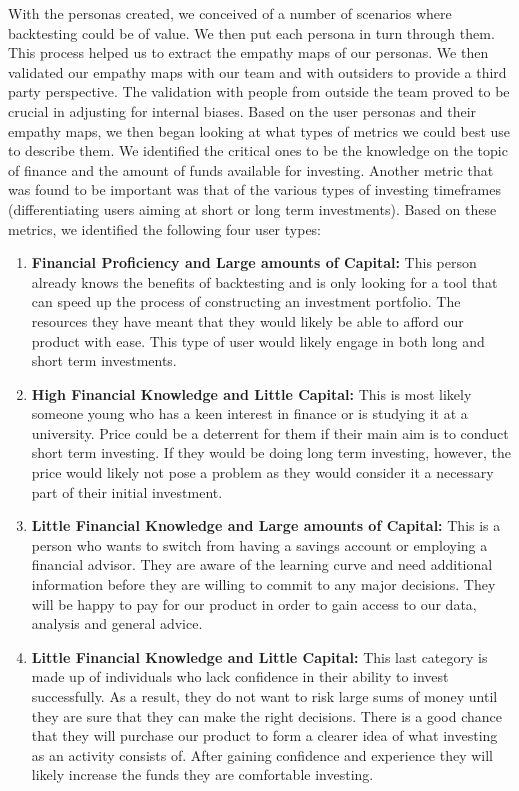 \documentclass[main.tex]{subfiles}
\begin{document}
With the personas created, we conceived of a number of scenarios where backtesting could be of value. We then put each persona in turn through them. This process helped us to extract the empathy maps \cite{empathy_maps} of our personas. We then validated our empathy maps with our team and with outsiders to provide a third party perspective. The validation with people from outside the team proved to be crucial in adjusting for internal biases.
Based on the user personas and their empathy maps, we then began looking at what types of metrics we could best use to describe them. We identified the critical ones to be the knowledge on the topic of finance and the amount of funds available for investing. Another metric that was found to be important was that of the various types of investing timeframes (differentiating users aiming at short or long term investments). Based on these metrics, we identified the following four user types:

\begin{enumerate}
    \item \textbf{Financial Proficiency and Large amounts of Capital:  }This person already knows the benefits of backtesting and is only looking for a tool that can speed up the process of constructing an investment portfolio. The resources they have meant that they would likely be able to afford our product with ease. This type of user would likely engage in both long and short term investments.
    \item \textbf{High Financial Knowledge and Little Capital:  } This is most likely someone young who has a keen interest in finance or is studying it at a university. Price could be a deterrent for them if their main aim is to conduct short term investing. If they would be doing long term investing, however, the price would likely not pose a problem as they would consider it a necessary part of their initial investment.
    \item \textbf{Little Financial Knowledge and Large amounts of Capital:  }This is a person who wants to switch from having a savings account or employing a financial advisor. They are aware of the learning curve and need additional information before they are willing to commit to any major decisions. They will be happy to pay for our product in order to gain access to our data, analysis and general advice.
    \item \textbf{Little Financial Knowledge and Little Capital:  }This last category is made up of individuals who lack confidence in their ability to invest successfully. As a result, they do not want to risk large sums of money until they are sure that they can make the right decisions. There is a good chance that they will purchase our product to form a clearer idea of what investing as an activity consists of. After gaining confidence and experience they will likely increase the funds they are comfortable investing.
\end{enumerate}
\end{document}
